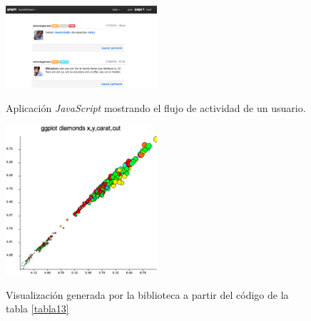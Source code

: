 \clearpage
\newpage


\vspace*{-3in}

\begin{figure}
\vspace{2.4in}
\caption{Aplicaci\'on \textit{JavaScript} mostrando el flujo de actividad de un usuario.}
\includegraphics[width=0.5\textwidth]{figura6}
\label{figura6}
\end{figure}

\clearpage
\newpage


\vspace*{-3in}

\begin{figure}
\vspace{2.4in}
\caption{Visualizaci\'on generada por la biblioteca a partir del c\'odigo de la tabla \ref{tabla13}}
\includegraphics[width=0.5\textwidth]{figura7}
\label{figura7}
\end{figure}

\clearpage
\newpage
